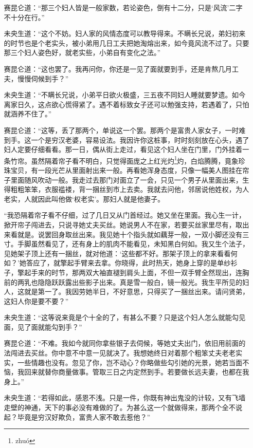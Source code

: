 \documentclass[a4paper,12pt,UTF8,twoside]{ctexbook}
\begin{document}
赛昆仑道：“那三个妇人皆是一般家数，若论姿色，倒有十二分，只是‘风流’二字不十分在行。”

未央生道：“这个不妨。妇人家的风情态度可以教导得来。不瞒长兄说，弟妇初来的时节也是个老实头，被小弟用几日工夫把她淘熔出来，如今竟风流不过了。只要那三个妇人姿色好，就老实些，小弟自有变化之法。”

赛昆仑道：“这也罢了。我再问你，你还是一见了面就要到手，还是肯熬几月工夫，慢慢伺候到手？”

未央生道：“不瞒长兄说，小弟平日欲火极盛，三五夜不同妇人睡就要梦遗。如今离家日久，这点欲心慌得紧了。遇不着标致女子还可以勉强支持，若遇着了，只怕就涵养不住了。”

赛昆仑道：“这等，丢了那两个，单说这一个罢。那两个是富贵人家女子，一时难到手。这一个是穷汉老婆，容易设法。我因许你这桩事，时时刻刻放在心头，遇了妇人定要仔细看看。那一日，偶从街上走过，看见这个妇人坐在门里，门外挂着一条竹帘。虽然隔着帘子看不明白，只觉得面庞之上红光灼\footnote{zhu\'o}灼，白焰腾腾，竟象珍珠宝贝，有一段光芒从里面射出来一般。再看她浑身态度，只像一幅美人图挂在帘子里面随风吹动一般。我走过去那门对面立了一会，只见一个男子从里面出来，生得粗粗笨笨，衣服褴褛，背一捆丝到市上去卖。我就去问他，邻居说他姓权，为人老实，人就因此叫他做‘权老实’。那妇人就是他妻子。

“我恐隔着帘子看不仔细，过了几日又从门首经过。她又坐在里面。我心生一计，掀开帘子闯进去，只说寻她丈夫买丝。她说男人不在家，若要买丝家里尽有，取出来看就是。说罢回身取丝出来。我见她十个指头就如藕芽一般，一双小脚还没有三寸。手脚虽然看见了，还有身上的肌肉不能看见，未知黑白何如。我又生个法子，见她架子顶上还有一捆丝，就对他道：‘这些都不好。那架子顶上的拿来看看何如？’她答应了，就擎起手臂来去拿。你晓得，此时热天，她身上穿的是单纱衫子，擎起手来的时节，那两双大袖直褪到肩头上面，不但一双手臂全然现出，连胸前的两乳也隐隐跃跃露出些影子出来。真是雪一般白，镜一般光。我生平所见的妇人，这就是第一了。我因劳她半日，不好意思，只得买了一捆丝出来。请问贤弟，这妇人你是要不要？”

未央生道：“这等说来竟是个十全的了，有甚么不要？只是这个妇人怎么就能勾见面，见了面就能勾到手？”

赛昆仑道：“不难。我如今就同你拿些银子去伺候，等她丈夫出门，依旧用前面的法闯进去买丝。你中意不中意一见就决了。我想她终日对着那个粗笨丈夫老老实实，一些情趣也没有。忽见了你，岂不动心？你略做些勾引她的光景，她若当面不恼，我回来就替你商量做事。管取三日之内定然到手。若要做长远夫妻，也都在我身上。”

未央生道：“若得如此，感恩不浅。只是一件，你既有神出鬼没的计较，又有飞墙走壁的神通，天下的事必没有难做的了。为甚么这一个就做得来，那两个全不说起？毕竟是穷汉好欺负，富贵人家不敢去惹他？”
\end{document}
